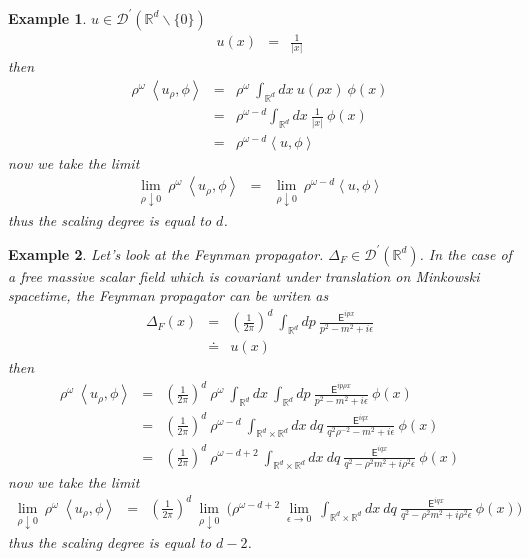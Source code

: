 \documentclass[10pt]{book}
\newcommand{\abs}[1]{\left|#1\right|}
\newcommand{\sm}[1]{\left\langle#1\right\rangle}
\let\int\int
\newcommand{\Dcal}{\mathcal{D}}
\newcommand{\Rbb}{\mathbb{R}}
\newcommand{\Esf}{\mathsf{E}}
\theoremstyle{break}
\newtheorem{example}{Example}
\begin{document}
\begin{example} 
 $u \in \Dcal^\prime(\Rbb^d \backslash \{0\})$
 \begin{eqnarray*}
  u(x) &=& \frac{1}{\abs{x}}
 \end{eqnarray*}
 then
 \begin{eqnarray*}
  \rho^\omega \ \sm{u_\rho,\phi} &=& \rho^\omega \ \int_{\Rbb^d} dx \ u(\rho x) \ \phi(x) \\
  &=& \rho^{\omega-d} \int_{\Rbb^d} dx \ \frac{1}{\abs{x}} \ \phi(x) \\
  &=& \rho^{\omega-d} \sm{u , \phi}
 \end{eqnarray*}
 now we take the limit
 \begin{eqnarray*}
  \lim_{\rho \downarrow 0} \ \rho^\omega \ \sm{u_\rho,\phi} &=& \lim_{\rho \downarrow 0} \ \rho^{\omega-d} \sm{u , \phi} 
 \end{eqnarray*}
 thus the scaling degree is equal to $d$. 
\end{example}

\begin{example} 
 Let's look at the Feynman propagator. $\Delta_F \in \Dcal^\prime(\Rbb^d)$. In the case of a free massive scalar field which is covariant under translation on Minkowski spacetime, the Feynman propagator can be writen as
 \begin{eqnarray*}
  \Delta_F(x) &=& \left(\frac{1}{2\pi}\right)^d \ \int_{\Rbb^d} dp \ \frac{\Esf^{ipx}}{p^2 - m^2 + i \epsilon} \\
  &\doteq& u(x) 
 \end{eqnarray*}
 then
 \begin{eqnarray*}
  \rho^\omega \ \sm{u_\rho,\phi} &=& \left(\frac{1}{2\pi}\right)^d \ \rho^\omega \ \int_{\Rbb^d} dx \ \int_{\Rbb^d} dp \ \frac{\Esf^{ip\rho x}}{p^2 - m^2 + i \epsilon}\ \phi(x) \\
  &=& \left(\frac{1}{2\pi}\right)^d \ \rho^{\omega-d} \ \int_{\Rbb^d \times \Rbb^d} dx \ dq \ \frac{\Esf^{iqx}}{q^2\rho^{-2} - m^2 + i \epsilon}\ \phi(x) \\
  &=& \left(\frac{1}{2\pi}\right)^d \ \rho^{\omega-d+2} \ \int_{\Rbb^d \times \Rbb^d} dx \ dq \ \frac{\Esf^{iqx}}{q^2 - \rho^2m^2 + i \rho^2\epsilon}\ \phi(x) 
 \end{eqnarray*}
 now we take the limit
 \begin{eqnarray*}
  \lim_{\rho \downarrow 0} \ \rho^\omega \ \sm{u_\rho,\phi} &=& \left(\frac{1}{2\pi}\right)^d \ \lim_{\rho \downarrow 0} \ \bigg(\rho^{\omega-d+2} \ \lim_{\epsilon \to 0} \ \int_{\Rbb^d \times \Rbb^d} dx \ dq \ \frac{\Esf^{iqx}}{q^2 - \rho^2m^2 + i \rho^2\epsilon}\ \phi(x)  \bigg) 
 \end{eqnarray*}
 thus the scaling degree is equal to $d-2$. 
\end{example}
\end{document}

